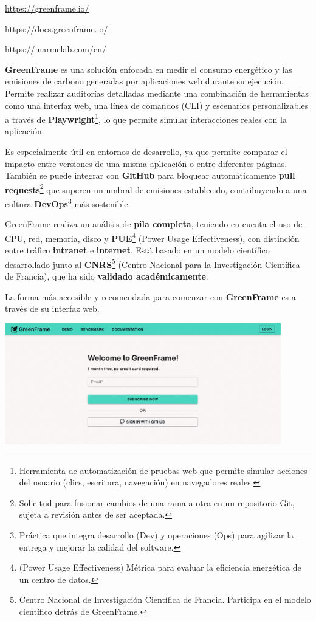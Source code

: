 \documentclass[12pt,a4paper]{report}
\begin{document}
\url{https://greenframe.io/}

\url{https://docs.greenframe.io/}

\url{https://marmelab.com/en/}

\textbf{GreenFrame} es una solución enfocada en medir el consumo energético y las emisiones de carbono generadas por aplicaciones web durante su ejecución. Permite realizar auditorías detalladas mediante una combinación de herramientas como una interfaz web, una línea de comandos (CLI) y escenarios personalizables a través de \textbf{Playwright}\footnote{Herramienta de automatización de pruebas web que permite simular acciones del usuario (clics, escritura, navegación) en navegadores reales.}, lo que permite simular interacciones reales con la aplicación.

Es especialmente útil en entornos de desarrollo, ya que permite comparar el
impacto entre versiones de una misma aplicación o entre diferentes páginas.
También se puede integrar con \textbf{GitHub} para bloquear automáticamente \textbf{pull
  requests}\footnote{Solicitud para fusionar cambios de una rama a otra en un
  repositorio Git, sujeta a revisión antes de ser aceptada.} que superen un
umbral de emisiones establecido, contribuyendo a una cultura
\textbf{DevOps}\footnote{Práctica que integra desarrollo (Dev) y operaciones
  (Ops) para agilizar la entrega y mejorar la calidad del software.} más
sostenible.

GreenFrame realiza un análisis de \textbf{pila completa}, teniendo en cuenta el
uso de CPU, red, memoria, disco y \textbf{PUE}\footnote{(Power Usage
  Effectiveness) Métrica para evaluar la eficiencia energética de un centro de
  datos.} (Power Usage Effectiveness), con distinción entre tráfico
\textbf{intranet} e \textbf{internet}. Está basado en un modelo científico
desarrollado junto al \textbf{CNRS}\footnote{Centro Nacional de Investigación
  Científica de Francia. Participa en el modelo científico detrás de GreenFrame.}
(Centro Nacional para la Investigación Científica de Francia), que ha sido
\textbf{validado académicamente}.

La forma más accesible y recomendada para comenzar con \textbf{GreenFrame} es a
través de su interfaz web.

\begin{center}
  \includegraphics[width=0.9\textwidth]{imagenes/Greenframe_1.png}
\end{center}
\end{document}
